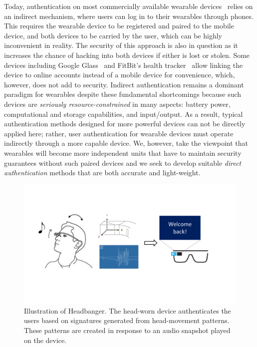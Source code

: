 \vspace{1mm}
Today, authentication on most commercially available wearable devices~\cite{fitbit, smartwatch} relies on an indirect mechanism, where users
can log in to their wearables through phones. This requires the wearable
device to be registered and paired to the mobile device, and both devices to be carried by the user, which can be highly inconvenient in reality. The security of this
approach is also in question as it increases the chance of hacking into both
devices if either is lost or stolen. Some devices including
Google Glass~\cite{googleglass} and FitBit's health tracker~\cite{fitbit}
allow linking the device to online accounts instead of a mobile device for
convenience,  which, however, does not add to security. Indirect authentication
remains a
dominant paradigm for wearables despite these fundamental shortcomings because
such devices are \emph{seriously resource-constrained} in many aspects:
battery power, computational and storage capabilities, and input/output. As a result, typical authentication methods designed for more
powerful devices can not be directly applied here; rather, user authentication for wearable devices must operate indirectly
through a more capable device. We, however, take the viewpoint that wearables will become more independent
units that have to maintain security guarantees without such paired devices
and we seek to develop suitable \emph{direct authentication} methods that are
both accurate and light-weight.
\vspace{-1mm}
\begin{figure}[t!]
\centering
\includegraphics[width=\columnwidth]{figure/headbanger_illustrate.png}
\caption{Illustration of Headbanger. The head-worn device authenticates the
users based on signatures generated from head-movement patterns.  These patterns are created in
response to an audio snapshot played on the device.}
\label{fig:headbanger-illustrate}
\end{figure}

